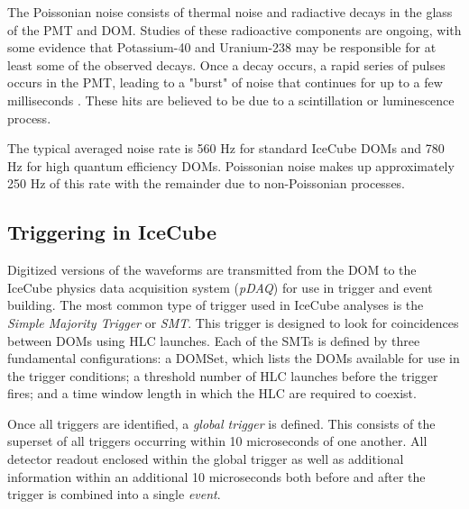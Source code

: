 The Poissonian noise consists of thermal noise and radiactive decays in the glass of the PMT and DOM.
Studies of these radioactive components are ongoing, with some evidence that Potassium-40 and Uranium-238 may be responsible for at least some of the observed decays.
Once a decay occurs, a rapid series of pulses occurs in the PMT, leading to a "burst" of noise that continues for up to a few milliseconds \cite{Thesis-Vuvuzela}. 
These hits are believed to be due to a scintillation or luminescence process.

The typical averaged noise rate is 560 Hz for standard IceCube DOMs and 780 Hz for high quantum efficiency DOMs.
Poissonian noise makes up approximately 250 Hz of this rate with the remainder due to non-Poissonian processes.

\label{subsec:triggers}
\subsection{Triggering in IceCube}
Digitized versions of the waveforms are transmitted from the DOM to the IceCube physics data acquisition system (\emph{pDAQ}) for use in trigger and event building.
The most common type of trigger used in IceCube analyses is the \emph{Simple Majority Trigger} or \emph{SMT}. 
This trigger is designed to look for coincidences between DOMs using HLC launches.
Each of the SMTs is defined by three fundamental configurations: a DOMSet, which lists the DOMs available for use in the trigger conditions; a threshold number of HLC launches before the trigger fires; and a time window length in which the HLC are required to coexist.

Once all triggers are identified, a \emph{global trigger} is defined. 
This consists of the superset of all triggers occurring within 10 microseconds of one another.
All detector readout enclosed within the global trigger as well as additional information within an additional 10 microseconds both before and after the trigger is combined into a single \emph{event}.

